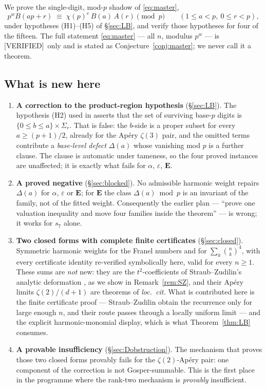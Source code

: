 \documentclass[11pt,reqno]{amsart}
\theoremstyle{plain}
\theoremstyle{definition}
\theoremstyle{remark}
\newcommand{\bin}[2]{\binom{#1}{#2}}
\newcommand{\Verified}{\textup{\textsf{[VERIFIED]}}}
\numberwithin{equation}{section}
\begin{document}
We prove the single-digit, mod-$p$ shadow of \eqref{eq:master},
\begin{equation}\label{eq:LB}
  p^{w}B(ap+r)\;\equiv\;\chi(p)^{e}\,B(a)\,A(r)\pmod p\qquad(1\le a<p,\ 0\le r<p),
\end{equation}
under hypotheses (H1)--(H5) of \S\ref{sec:LB}, and verify those hypotheses for four of the
fifteen. The full statement \eqref{eq:master} --- all $n$, modulus $p^w$ --- is
\Verified\ only and is stated as Conjecture~\ref{conj:master}; we never call it a theorem.

\subsection{What is new here}
\begin{enumerate}[leftmargin=2em]
\item \textbf{A correction to the product-region hypothesis} (\S\ref{sec:LB}). The
  hypothesis (H2) used in \cite{CompanionLucas2nd} asserts that the set of surviving
  base-$p$ digits is $\{0\le b\le a\}\times\Sigma_r$. That is false: the $b$-side is a
  proper subset for every $a\ge(p+1)/2$, already for the Ap\'ery $\zeta(3)$ pair, and the
  omitted terms contribute a \emph{base-level defect} $\Delta(a)$ whose vanishing mod $p$
  is a further clause. The clause is automatic under tameness, so the four proved instances
  are unaffected; it is exactly what fails for $\alpha$, $\varepsilon$, $\mathbf E$.
\item \textbf{A proved negative} (\S\ref{sec:blocked}). No admissible harmonic weight
  repairs $\Delta(a)$ for $\alpha$, $\varepsilon$ or $\mathbf E$; for $\mathbf E$ the class
  $\Delta(a)\bmod p$ is an invariant of the family, not of the fitted weight. Consequently
  the earlier plan --- ``prove one valuation inequality and move four families inside the
  theorem'' --- is wrong; it works for $s_7$ alone.
\item \textbf{Two closed forms with complete finite certificates} (\S\ref{sec:closed}).
  Symmetric harmonic weights for the Franel numbers and for $\sum_k\bin nk^4$, with every
  certificate identity re-verified symbolically here, valid for every $n\ge1$. These sums
  are \emph{not} new: they are the $t^2$-coefficients of Straub--Zudilin's analytic
  deformation \cite{StraubZudilin}, as we show in Remark~\ref{rem:SZ}, and their Ap\'ery
  limits $\zeta(2)/(d+1)$ are theorems of \emph{loc.\ cit.} What is contributed here is the
  finite certificate proof --- Straub--Zudilin obtain the recurrence only for large enough
  $n$, and their route passes through a locally uniform limit --- and the explicit
  harmonic-monomial display, which is what Theorem~\ref{thm:LB} consumes.
\item \textbf{A provable insufficiency} (\S\ref{sec:Dobstruction}). The mechanism that
  proves those two closed forms provably fails for the $\zeta(2)$-Ap\'ery pair: one
  component of the correction is not Gosper-summable. This is the first place in the
  programme where the rank-two mechanism is \emph{provably} insufficient.
\end{enumerate}
\end{document}

